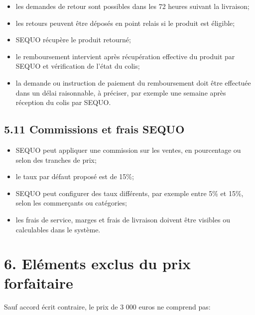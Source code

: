 \documentclass[11pt,a4paper]{article}
\begin{document}
\begin{itemize}
    \item les demandes de retour sont possibles dans les 72 heures suivant la livraison;
    \item les retours peuvent être déposés en point relais si le produit est éligible;
    \item SEQUO récupère le produit retourné;
    \item le remboursement intervient après récupération effective du produit par SEQUO et vérification de l'état du colis;
    \item la demande ou instruction de paiement du remboursement doit être effectuée dans un délai raisonnable, à préciser, par exemple une semaine après réception du colis par SEQUO.
\end{itemize}

\subsection*{5.11 Commissions et frais SEQUO}

\begin{itemize}
    \item SEQUO peut appliquer une commission sur les ventes, en pourcentage ou selon des tranches de prix;
    \item le taux par défaut proposé est de 15\%;
    \item SEQUO peut configurer des taux différents, par exemple entre 5\% et 15\%, selon les commerçants ou catégories;
    \item les frais de service, marges et frais de livraison doivent être visibles ou calculables dans le système.
\end{itemize}

\section*{6. Eléments exclus du prix forfaitaire}

Sauf accord écrit contraire, le prix de 3 000 euros ne comprend pas:
\end{document}
